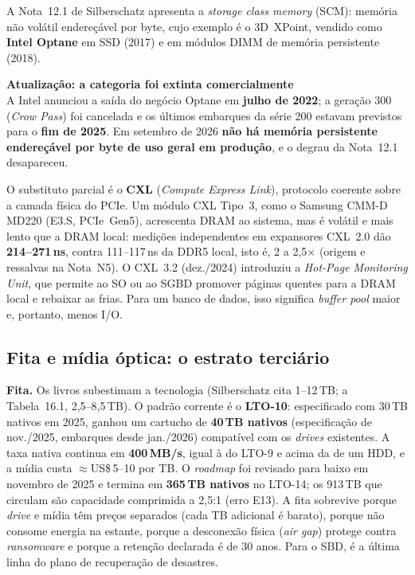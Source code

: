 \documentclass[11pt,a4paper]{article}
\newcommand{\correcao}[2]{%
  \begin{center}\begin{minipage}{0.97\textwidth}
  \colorbox{fundo}{\begin{minipage}{\dimexpr\linewidth-2\fboxsep}
  \vspace{3pt}\textbf{\color{laranja}#1}\\[2pt]\small #2\vspace{3pt}
  \end{minipage}}\end{minipage}\end{center}}
\begin{document}
A Nota~12.1 de Silberschatz apresenta a \emph{storage class memory} (SCM): memória não volátil
endereçável por byte, cujo exemplo é o 3D~XPoint, vendido como \textbf{Intel Optane} em SSD
(2017) e em módulos DIMM de memória persistente (2018).

\correcao{Atualização: a categoria foi extinta comercialmente}{%
A Intel anunciou a saída do negócio Optane em \textbf{julho de 2022}; a geração 300
(\emph{Crow Pass}) foi cancelada e os últimos embarques da série 200 estavam previstos para o
\textbf{fim de 2025}. Em setembro de 2026 \textbf{não há memória persistente endereçável por
byte de uso geral em produção}, e o degrau da Nota~12.1 desapareceu.}

O substituto parcial é o \textbf{CXL} (\emph{Compute Express Link}), protocolo coerente sobre
a camada física do PCIe. Um módulo CXL Tipo~3, como o Samsung CMM-D MD220 (E3.S, PCIe~Gen5),
acrescenta DRAM ao sistema, mas é volátil e mais lento que a DRAM local:
medições independentes em expansores CXL~2.0 dão \textbf{214--271\,ns}, contra 111--117\,ns
da DDR5 local, isto é, 2 a 2,5$\times$ (origem e ressalvas na Nota~N5). O CXL~3.2 (dez./2024)
introduziu a \emph{Hot-Page Monitoring Unit}, que permite ao SO ou ao SGBD promover páginas
quentes para a DRAM local e rebaixar as frias. Para um banco de dados, isso significa
\emph{buffer pool} maior e, portanto, menos I/O.

\subsection{Fita e mídia óptica: o estrato terciário}

\textbf{Fita.} Os livros subestimam a tecnologia (Silberschatz cita 1--12\,TB; a Tabela~16.1,
2,5--8,5\,TB). O padrão corrente é o \textbf{LTO-10}: especificado com 30\,TB nativos em
2025, ganhou um cartucho de \textbf{40\,TB nativos} (especificação de nov./2025, embarques
desde jan./2026) compatível com os \emph{drives} existentes. A taxa nativa continua em
\textbf{400\,MB/s}, igual à do LTO-9 e acima da de um HDD, e a mídia custa $\approx$US\$\,5--10
por TB. O \emph{roadmap} foi revisado para baixo em novembro de 2025 e termina em
\textbf{365\,TB nativos} no LTO-14; os 913\,TB que circulam são capacidade comprimida a
2,5:1 (erro E13). A fita sobrevive porque \emph{drive} e mídia têm preços separados (cada TB
adicional é barato), porque não consome energia na estante, porque a desconexão física
(\emph{air gap}) protege contra \emph{ransomware} e porque a retenção declarada é de 30 anos.
Para o SBD, é a última linha do plano de recuperação de desastres.
\end{document}
